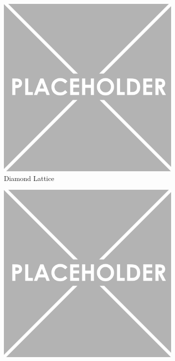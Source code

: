 \begin{figure}[p]
  \centering
  \begin{subfigure}[b]{0.45\textwidth}
    \centering
    \includegraphics[width=\textwidth]{images/placeholder}
    \caption{Diamond Lattice}
    \label{fig:diamond lattice}
  \end{subfigure}
  \hfill
  \begin{subfigure}[b]{0.45\textwidth}
    \centering
    \includegraphics[width=\textwidth]{images/placeholder}

\end{subfigure}
\end{figure}
